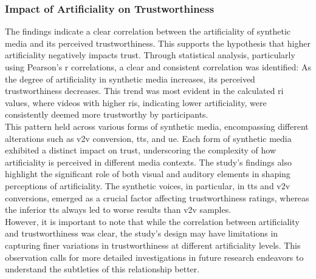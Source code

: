 \documentclass[
  a4paper,  %
  twoside,  %
  bibliography=totoc,
  headsepline,
  cleardoublepage=empty,
  parskip=half,
  draft=false
]{scrbook}
\begin{document}
\subsubsection{Impact of Artificiality on Trustworthiness}
The findings indicate a clear correlation between the artificiality of synthetic media and its perceived trustworthiness. This supports the hypothesis that higher artificiality negatively impacts trust. Through statistical analysis, particularly using Pearson's r correlations, a clear and consistent correlation was identified: As the degree of artificiality in synthetic media increases, its perceived trustworthiness decreases. This trend was most evident in the calculated \gls{ri} values, where videos with higher \gls{ri}s, indicating lower artificiality, were consistently deemed more trustworthy by participants. \\
This pattern held across various forms of synthetic media, encompassing different alterations such as \gls{v2v} conversion, \gls{tts}, and \gls{ue}. Each form of synthetic media exhibited a distinct impact on trust, underscoring the complexity of how artificiality is perceived in different media contexts. The study's findings also highlight the significant role of both visual and auditory elements in shaping perceptions of artificiality. The synthetic voices, in particular, in \gls{tts} and \gls{v2v} conversions, emerged as a crucial factor affecting trustworthiness ratings, whereas the inferior \gls{tts} always led to worse results than \gls{v2v} samples. \\
However, it is important to note that while the correlation between artificiality and trustworthiness was clear, the study's design may have limitations in capturing finer variations in trustworthiness at different artificiality levels. This observation calls for more detailed investigations in future research endeavors to understand the subtleties of this relationship better.
\end{document}

